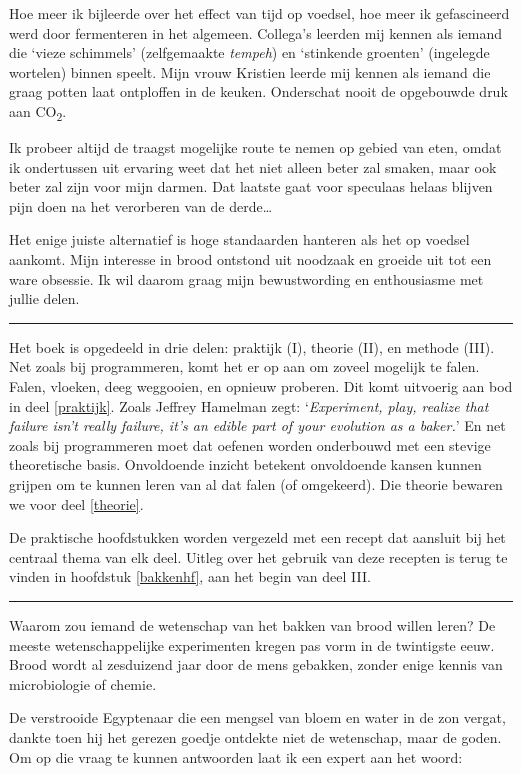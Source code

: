 \documentclass[
  11pt,
  dutch,
]{memoir}
\begin{document}
Hoe meer ik bijleerde over het effect van tijd op voedsel, hoe meer ik
gefascineerd werd door fermenteren in het algemeen. Collega's leerden
mij kennen als iemand die `vieze schimmels' (zelfgemaakte \emph{tempeh})
en `stinkende groenten' (ingelegde wortelen) binnen speelt. Mijn vrouw
Kristien leerde mij kennen als iemand die graag potten laat ontploffen
in de keuken. Onderschat nooit de opgebouwde druk aan
CO\textsubscript{2}.

Ik probeer altijd de traagst mogelijke route te nemen op gebied van
eten, omdat ik ondertussen uit ervaring weet dat het niet alleen beter
zal smaken, maar ook beter zal zijn voor mijn darmen. Dat laatste gaat
voor speculaas helaas blijven pijn doen na het verorberen van de
derde\ldots{}

Het enige juiste alternatief is hoge standaarden hanteren als het op
voedsel aankomt. Mijn interesse in brood ontstond uit noodzaak en
groeide uit tot een ware obsessie. Ik wil daarom graag mijn
bewustwording en enthousiasme met jullie delen.

\pfbreak

Het boek is opgedeeld in drie delen: praktijk (I), theorie (II), en
methode (III). Net zoals bij programmeren, komt het er op aan om zoveel
mogelijk te falen. Falen, vloeken, deeg weggooien, en opnieuw proberen.
Dit komt uitvoerig aan bod in deel \ref{praktijk}. Zoals Jeffrey
Hamelman zegt: `\emph{Experiment, play, realize that failure isn't
really failure, it's an edible part of your evolution as a baker.}' En
net zoals bij programmeren moet dat oefenen worden onderbouwd met een
stevige theoretische basis. Onvoldoende inzicht betekent onvoldoende
kansen kunnen grijpen om te kunnen leren van al dat falen (of
omgekeerd). Die theorie bewaren we voor deel \ref{theorie}.

De praktische hoofdstukken worden vergezeld met een recept dat aansluit
bij het centraal thema van elk deel. Uitleg over het gebruik van deze
recepten is terug te vinden in hoofdstuk \ref{bakkenhf}, aan het begin
van deel III.

\pfbreak

Waarom zou iemand de wetenschap van het bakken van brood willen leren?
De meeste wetenschappelijke experimenten kregen pas vorm in de
twintigste eeuw. Brood wordt al zesduizend jaar door de mens gebakken,
zonder enige kennis van microbiologie of chemie.

De verstrooide Egyptenaar die een mengsel van bloem en water in de zon
vergat, dankte toen hij het gerezen goedje ontdekte niet de wetenschap,
maar de goden. Om op die vraag te kunnen antwoorden laat ik een expert
aan het woord:
\end{document}
